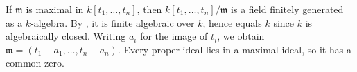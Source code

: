 If $\mathfrak{m}$ is maximal in $k[t_1,\ldots,t_n]$, then $k[t_1,\ldots,t_n]/\mathfrak{m}$ is a field finitely generated as a $k$-algebra. By , it is finite algebraic over $k$, hence equals $k$ since $k$ is algebraically closed. Writing $a_i$ for the image of $t_i$, we obtain $\mathfrak{m}=(t_1-a_1,\ldots,t_n-a_n)$. Every proper ideal lies in a maximal ideal, so it has a common zero.
